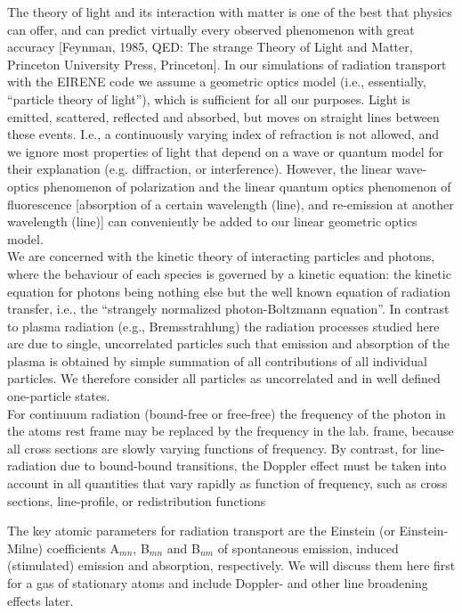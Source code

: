 The theory of light and its interaction with matter is one of the
best that physics can offer, and can predict virtually every
observed phenomenon with great accuracy [Feynman, 1985, QED: The
strange Theory of Light and Matter, Princeton University Press,
Princeton]. In our simulations of radiation transport with the
EIRENE code we assume a geometric optics model (i.e., essentially,
``particle theory of light''), which is sufficient for all our
purposes. Light is emitted, scattered, reflected and absorbed, but moves on
straight lines between these events. I.e., a continuously varying
index of refraction is not allowed, and we ignore most properties
of light that depend on a wave or quantum model for their
explanation (e.g. diffraction, or interference). However, the
linear wave-optics phenomenon of polarization and the linear
quantum optics phenomenon of fluorescence [absorption of a certain
wavelength (line), and re-emission at another wavelength
(line)] can conveniently be added to our linear geometric optics model.\\
We are concerned with the kinetic theory of interacting particles
and photons, where the behaviour of each species is governed by a
kinetic equation: the kinetic equation for photons being nothing
else but the well known equation of radiation transfer, i.e., the
``strangely normalized photon-Boltzmann equation''. In contrast to
plasma radiation (e.g., Bremsstrahlung) the radiation processes
studied here are due to single, uncorrelated particles such that
emission and absorption of the plasma is obtained by simple
summation of all contributions of all individual particles. We
therefore consider all particles as uncorrelated and in well
defined one-particle states.\\

For continuum radiation (bound-free or free-free) the frequency of
the photon in the atoms rest frame may be replaced by the
frequency in the lab. frame, because all cross sections are slowly
varying functions of frequency. By contrast, for line-radiation
due to bound-bound transitions, the Doppler effect must be taken
into account in all quantities that vary rapidly as function of
frequency, such as cross sections, line-profile, or redistribution
functions

The key atomic parameters for radiation transport are
the Einstein (or Einstein-Milne) coefficients A$_{mn}$, B$_{mn}$
and B$_{nm}$ of spontaneous emission, induced (stimulated) emission
and absorption, respectively. We will discuss them here first for
a gas of stationary atoms and include Doppler- and other line
broadening effects later.

